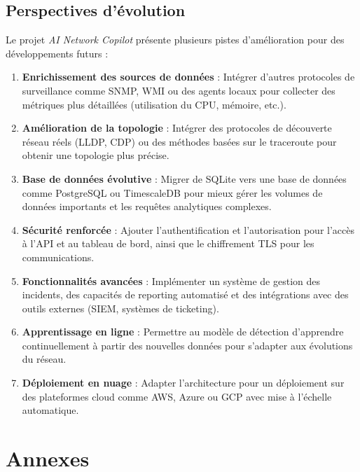 \documentclass[12pt,a4paper]{report}
\begin{document}
\section{Perspectives d'évolution}
Le projet \textit{AI Network Copilot} présente plusieurs pistes d'amélioration pour des développements futurs :
\begin{enumerate}
    \item \textbf{Enrichissement des sources de données} : Intégrer d'autres protocoles de surveillance comme SNMP, WMI ou des agents locaux pour collecter des métriques plus détaillées (utilisation du CPU, mémoire, etc.).
    \item \textbf{Amélioration de la topologie} : Intégrer des protocoles de découverte réseau réels (LLDP, CDP) ou des méthodes basées sur le traceroute pour obtenir une topologie plus précise.
    \item \textbf{Base de données évolutive} : Migrer de SQLite vers une base de données comme PostgreSQL ou TimescaleDB pour mieux gérer les volumes de données importants et les requêtes analytiques complexes.
    \item \textbf{Sécurité renforcée} : Ajouter l'authentification et l'autorisation pour l'accès à l'API et au tableau de bord, ainsi que le chiffrement TLS pour les communications.
    \item \textbf{Fonctionnalités avancées} : Implémenter un système de gestion des incidents, des capacités de reporting automatisé et des intégrations avec des outils externes (SIEM, systèmes de ticketing).
    \item \textbf{Apprentissage en ligne} : Permettre au modèle de détection d'apprendre continuellement à partir des nouvelles données pour s'adapter aux évolutions du réseau.
    \item \textbf{Déploiement en nuage} : Adapter l'architecture pour un déploiement sur des plateformes cloud comme AWS, Azure ou GCP avec mise à l'échelle automatique.
\end{enumerate}

\chapter{Annexes}
\end{document}
